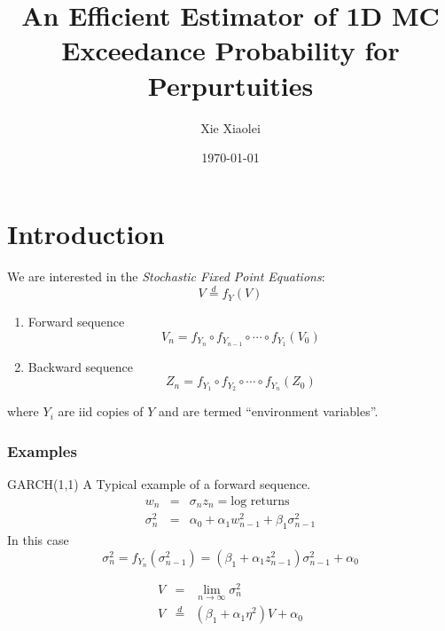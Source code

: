 \documentclass{beamer}
\title{An Efficient Estimator of 1D MC Exceedance Probability for
  Perpurtuities}
\author{Xie Xiaolei} %
\institute[UCPH] %
{
Copenhagen University  \\ %
\medskip
\textit{xie@math.ku.dk} %
}
\date{\today} %
\begin{document}
\begin{frame}
\titlepage %
\end{frame}


\section{Introduction}
\begin{frame}
  We are interested in the {\it Stochastic Fixed Point Equations}:
  \[
  V \overset{d}{=} f_Y(V)
  \]
  \begin{enumerate}
  \item Forward sequence
    \[
    V_n = f_{Y_n} \circ f_{Y_{n-1}} \circ \cdots \circ f_{Y_1} (V_0)
    \]
    \item Backward sequence
      \[
      Z_n  = f_{Y_1} \circ f_{Y_{2}} \circ \cdots \circ f_{Y_n} (Z_0)
      \]
    \end{enumerate}
    where $Y_i$ are iid copies of $Y$ and are termed ``environment
    variables''.
\end{frame}

\begin{frame}
  \frametitle{Examples}
  \begin{exampleblock}{GARCH(1,1)}
    A Typical example of a forward sequence.
    \begin{eqnarray*}
      w_n &=& \sigma_n z_n = \text{log returns} \\
      \sigma_n^2 &=& \alpha_0 + \alpha_1 w_{n-1}^2 + \beta_1 \sigma_{n-1}^2
    \end{eqnarray*}
    In this case
    \[
    \sigma_n^2 = f_{Y_n} (\sigma_{n-1}^2) =
    (\beta_1 + \alpha_1 z_{n-1}^2) \sigma_{n-1}^2
    + \alpha_0
    \]
  \end{exampleblock}
    \begin{eqnarray*}
      V &=& \lim_{n \to \infty} \sigma_n^2   \\
      V &\overset{d}{=}& (\beta_1 + \alpha_1 \eta^2) V + \alpha_0
    \end{eqnarray*}
\end{frame}
\end{document}
